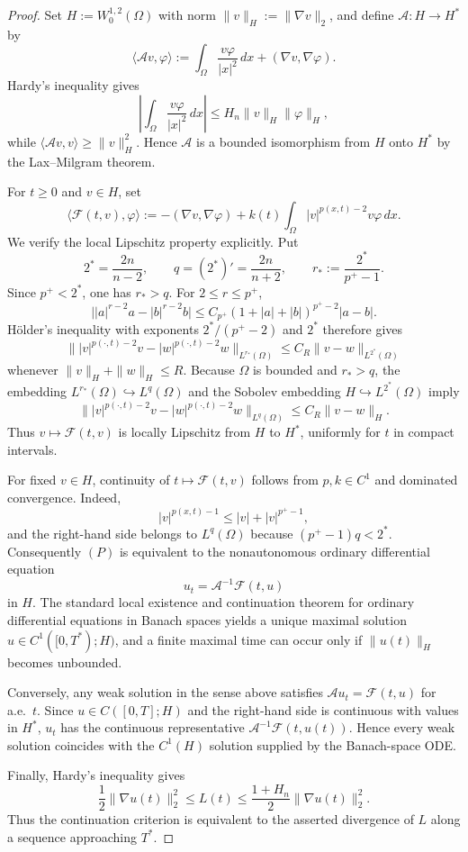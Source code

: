 \documentclass[12pt,reqno]{amsart}
\theoremstyle{definition}
\theoremstyle{remark}
\numberwithin{equation}{section}
\begin{document}
\begin{proof}
Set $H:=W^{1,2}_0(\Omega)$ with norm $\|v\|_H:=\|\nabla v\|_2$, and define $\mathcal A:H\to H^*$ by
\[
\langle \mathcal A v,\varphi\rangle
:=\int_\Omega\frac{v\varphi}{|x|^2}\,dx+(\nabla v,\nabla\varphi).
\]
Hardy's inequality gives
\[
\left|\int_\Omega\frac{v\varphi}{|x|^2}\,dx\right|
\le H_n\|v\|_H\|\varphi\|_H,
\]
while $\langle\mathcal Av,v\rangle\ge\|v\|_H^2$. Hence $\mathcal A$ is a bounded isomorphism from $H$ onto $H^*$ by the Lax--Milgram theorem.

For $t\ge0$ and $v\in H$, set
\[
\langle\mathcal F(t,v),\varphi\rangle
:=-(\nabla v,\nabla\varphi)
+k(t)\int_\Omega |v|^{p(x,t)-2}v\varphi\,dx.
\]
We verify the local Lipschitz property explicitly. Put
\[
2^*=\frac{2n}{n-2},\qquad q=(2^*)'=\frac{2n}{n+2},
\qquad r_*:=\frac{2^*}{p^+-1}.
\]
Since $p^+<2^*$, one has $r_*>q$. For $2\le r\le p^+$,
\[
\big||a|^{r-2}a-|b|^{r-2}b\big|
\le C_{p^+}(1+|a|+|b|)^{p^+-2}|a-b|.
\]
H\"older's inequality with exponents $2^*/(p^+-2)$ and $2^*$ therefore gives
\[
\big\||v|^{p(\cdot,t)-2}v-|w|^{p(\cdot,t)-2}w\big\|_{L^{r_*}(\Omega)}
\le C_R\|v-w\|_{L^{2^*}(\Omega)}
\]
whenever $\|v\|_H+\|w\|_H\le R$. Because $\Omega$ is bounded and $r_*>q$, the embedding $L^{r_*}(\Omega)\hookrightarrow L^q(\Omega)$ and the Sobolev embedding $H\hookrightarrow L^{2^*}(\Omega)$ imply
\[
\big\||v|^{p(\cdot,t)-2}v-|w|^{p(\cdot,t)-2}w\big\|_{L^q(\Omega)}
\le C_R\|v-w\|_H.
\]
Thus $v\mapsto\mathcal F(t,v)$ is locally Lipschitz from $H$ to $H^*$, uniformly for $t$ in compact intervals.

For fixed $v\in H$, continuity of $t\mapsto\mathcal F(t,v)$ follows from $p,k\in C^1$ and dominated convergence. Indeed,
\[
|v|^{p(x,t)-1}\le |v|+|v|^{p^+-1},
\]
and the right-hand side belongs to $L^q(\Omega)$ because $(p^+-1)q<2^*$. Consequently $(P)$ is equivalent to the nonautonomous ordinary differential equation
\[
u_t=\mathcal A^{-1}\mathcal F(t,u)
\]
in $H$. The standard local existence and continuation theorem for ordinary differential equations in Banach spaces \cite{Deimling} yields a unique maximal solution $u\in C^1([0,T^*);H)$, and a finite maximal time can occur only if $\|u(t)\|_H$ becomes unbounded.

Conversely, any weak solution in the sense above satisfies $\mathcal A u_t=\mathcal F(t,u)$ for a.e.\ $t$. Since $u\in C([0,T];H)$ and the right-hand side is continuous with values in $H^*$, $u_t$ has the continuous representative $\mathcal A^{-1}\mathcal F(t,u(t))$. Hence every weak solution coincides with the $C^1(H)$ solution supplied by the Banach-space ODE.

Finally, Hardy's inequality gives
\[
\frac12\|\nabla u(t)\|_2^2\le L(t)
\le\frac{1+H_n}{2}\|\nabla u(t)\|_2^2.
\]
Thus the continuation criterion is equivalent to the asserted divergence of $L$ along a sequence approaching $T^*$.
\end{proof}
\end{document}
